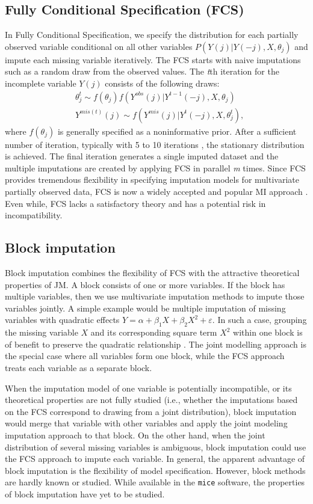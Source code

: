	\subsection{Fully Conditional Specification (FCS)}
	In Fully Conditional Specification, we specify the distribution for each partially observed variable conditional on all other variables $P(Y(j)|Y(-j), X, \theta_{j})$ and impute each missing variable iteratively. The FCS starts with naive imputations such as a random draw from the observed values. The \emph{t}th iteration for the incomplete variable \emph{$Y(j)$} consists of the following draws:
	\begin{align*}
		&\theta_{j}^{t} \sim f(\theta_{j})f(Y^{obs}(j)|Y^{t-1}(-j), X, \theta_{j})\\
		&Y^{mis(t)}(j) \sim f(Y^{mis}(j)|Y^{t}(-j), X, \theta_{j}^{t}),
	\end{align*}
	where $f(\theta_{j})$ is generally specified as a noninformative prior. After a sufficient number of iteration, typically with 5 to 10 iterations \citep{Buuren2018}, the stationary distribution is achieved. The final iteration generates a single imputed dataset and the multiple imputations are created by applying FCS in parallel \emph{m} times. Since FCS provides tremendous flexibility in specifying imputation models for multivariate partially observed data, FCS is now a widely accepted and popular MI approach \citep{van2007multiple}. Even while, FCS lacks a satisfactory theory and has a potential risk in incompatibility. 
	
	\subsection{Block imputation}
	Block imputation combines the flexibility of FCS with the attractive theoretical properties of JM. A block consists of one or more variables. If the block has multiple variables, then we use multivariate imputation methods to impute those variables jointly. A simple example would be multiple imputation of missing variables with quadratic effects $Y = \alpha + \beta_{1}X + \beta_{2}X^2 + \varepsilon$. In such a case, grouping the missing variable $X$ and its corresponding square term $X^2$ within one block is of benefit to preserve the quadratic relationship \citep{vink2019}. The joint modelling approach is the special case where all variables form one block, while the FCS approach treats each variable as a separate block. 
	
	When the imputation model of one variable is potentially incompatible, or its theoretical properties are not fully studied (i.e., whether the imputations based on the FCS correspond to drawing from a joint distribution), block imputation would merge that variable with other variables and apply the joint modeling imputation approach to that block. On the other hand, when the joint distribution of several missing variables is ambiguous, block imputation could use the FCS approach to impute each variable. In general, the apparent advantage of block imputation is the flexibility of model specification. However, block methods are hardly known or studied. While available in the \texttt{mice} software, the properties of block imputation have yet to be studied.  
	
